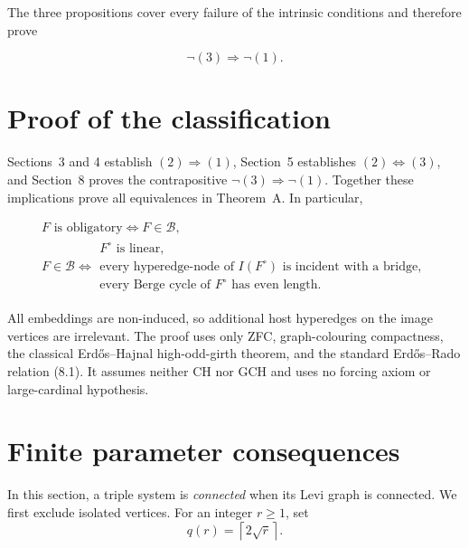\documentclass[a4paper,11pt,reqno]{amsart}
\theoremstyle{plain}
\theoremstyle{definition}
\theoremstyle{remark}
\begin{document}
The three propositions cover every failure of the intrinsic conditions and
therefore prove

\[
\neg(3)\Longrightarrow\neg(1). \tag{8.2}
\]

\section{Proof of the classification}\label{conclusion}

Sections~3 and 4 establish \((2)\Longrightarrow(1)\), Section~5 establishes
\((2)\Longleftrightarrow(3)\), and Section~8 proves the contrapositive
\(\neg(3)\Longrightarrow\neg(1)\).  Together these implications prove all
equivalences in Theorem~A.  In particular,

\begingroup\small
\[
\begin{gathered}
F\text{ is obligatory}
\iff
F\in\mathcal B,\\[1mm]
F\in\mathcal B
\iff
\begin{array}{l}
F^\circ\text{ is linear},\\[1mm]
\text{every hyperedge-node of }I(F^\circ)
\text{ is incident with a bridge},\\[1mm]
\text{every Berge cycle of }F^\circ\text{ has even length}.
\end{array}
\end{gathered}
\]
\endgroup

All embeddings are non-induced, so additional host hyperedges on the image
vertices are irrelevant.  The proof uses only ZFC, graph-colouring
compactness, the classical Erd\H{o}s--Hajnal high-odd-girth theorem, and the
standard Erd\H{o}s--Rado relation (8.1).  It assumes neither CH nor GCH and
uses no forcing axiom or large-cardinal hypothesis.

\section{Finite parameter consequences}\label{finite-parameter-consequences}

In this section, a triple system is \emph{connected} when its Levi graph is
connected.  We first exclude isolated vertices.  For an integer $r\ge1$, set
\[
q(r)=\left\lceil2\sqrt r\right\rceil.
\]
\end{document}
